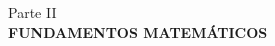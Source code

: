 \newpage
\thispagestyle{empty}
\vspace*{\fill}
\begin{center}
    \large Parte II \\
    \vspace{0.5cm}           
    \LARGE \textbf{FUNDAMENTOS MATEMÁTICOS}
\end{center}
\vspace*{\fill}
\newpage
\setcounter{page}{1}  